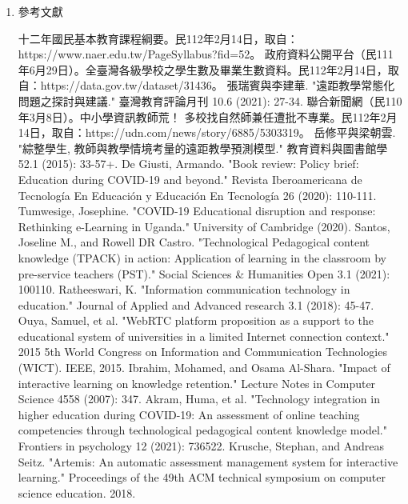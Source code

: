\documentclass[12pt]{article}
\begin{document}
\begin{enumerate}
  \item 參考文獻
    \renewcommand{\section}[2]{}
    \begin{thebibliography}{99}
       十二年國民基本教育課程綱要。民112年2月14日，取自：https://www.naer.edu.tw/PageSyllabus?fid=52。
       政府資料公開平台（民111年6月29日）。全臺灣各級學校之學生數及畢業生數資料。民112年2月14日，取自：https://data.gov.tw/dataset/31436。
       張瑞賓與李建華. "遠距教學常態化問題之探討與建議." 臺灣教育評論月刊 10.6 (2021): 27-34.
       聯合新聞網（民110年3月8日）。中小學資訊教師荒！ 多校找自然師兼任遭批不專業。民112年2月14日，取自：https://udn.com/news/story/6885/5303319。
       岳修平與梁朝雲. "綜整學生, 教師與教學情境考量的遠距教學預測模型." 教育資料與圖書館學 52.1 (2015): 33-57+.
       De Giusti, Armando. "Book review: Policy brief: Education during COVID-19 and beyond." Revista Iberoamericana de Tecnología En Educación y Educación En Tecnología 26 (2020): 110-111.
       Tumwesige, Josephine. "COVID-19 Educational disruption and response: Rethinking e-Learning in Uganda." University of Cambridge (2020).
       Santos, Joseline M., and Rowell DR Castro. "Technological Pedagogical content knowledge (TPACK) in action: Application of learning in the classroom by pre-service teachers (PST)." Social Sciences \& Humanities Open 3.1 (2021): 100110.
       Ratheeswari, K. "Information communication technology in education." Journal of Applied and Advanced research 3.1 (2018): 45-47.
       Ouya, Samuel, et al. "WebRTC platform proposition as a support to the educational system of universities in a limited Internet connection context." 2015 5th World Congress on Information and Communication Technologies (WICT). IEEE, 2015.
       Ibrahim, Mohamed, and Osama Al-Shara. "Impact of interactive learning on knowledge retention." Lecture Notes in Computer Science 4558 (2007): 347.
       Akram, Huma, et al. "Technology integration in higher education during COVID-19: An assessment of online teaching competencies through technological pedagogical content knowledge model." Frontiers in psychology 12 (2021): 736522.
       Krusche, Stephan, and Andreas Seitz. "Artemis: An automatic assessment management system for interactive learning." Proceedings of the 49th ACM technical symposium on computer science education. 2018.

\end{thebibliography}
\end{enumerate}
\end{document}
